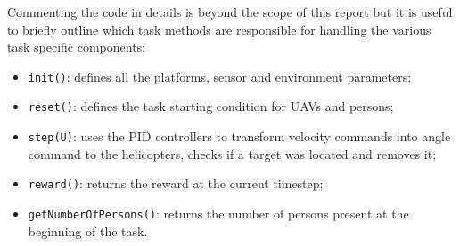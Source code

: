 \documentclass[a4paper,11pt]{report}
\newcommand\mytexttt[1]{\texttt{\hyphenchar\font=45\relax #1}}
\begin{document}
Commenting the code in details is beyond the scope of this report but it is useful to briefly outline which task methods are responsible for handling the various task specific components:
\begin{itemize}
\item\mytexttt{init()}: defines all the platforms, sensor and environment parameters;
\item\mytexttt{reset()}: defines the task starting condition for UAVs and persons;
\item\mytexttt{step(U)}: uses the PID controllers to transform velocity commands into angle command to the helicopters, checks if a target was located and removes it;
\item\mytexttt{reward()}: returns the reward at the current timestep;
\item\mytexttt{getNumberOfPersons()}: returns the number of persons present at the beginning of the task.
\end{itemize}
\end{document}
